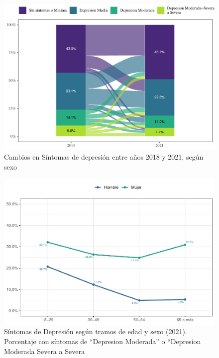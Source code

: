 \documentclass[
  12pt,
]{book}
\begin{document}
\begin{figure}

{\centering \includegraphics{reporte-elsoc_files/figure-latex/depre-sexo-1} 

}

\caption{Cambios en Síntomas de depresión entre años 2018 y 2021, según sexo}\label{fig:depre-sexo}
\end{figure}

\begin{figure}

{\centering \includegraphics{reporte-elsoc_files/figure-latex/depre-edad-sexo-1} 

}

\caption{Síntomas de Depresión según tramos de edad y sexo (2021). Porcentaje con síntomas de “Depresion Moderada” o “Depresion Moderada Severa a Severa}\label{fig:depre-edad-sexo}
\end{figure}
\end{document}
